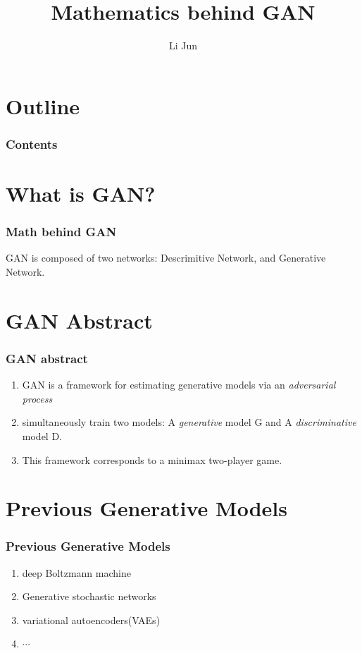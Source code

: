\documentclass{beamer}
\title{Mathematics behind GAN}
\author{Li Jun}
\begin{document}
\begin{frame}
 \titlepage  
\end{frame}

\section*{Outline}
\begin{frame}
  \frametitle{Contents}
  \tableofcontents
\end{frame}

\section{What is GAN?}
\begin{frame}
  \frametitle{Math behind GAN}
  \begin{definition}
    GAN is composed of two networks: Descrimitive Network, and Generative Network.
  \end{definition}
\end{frame}

\section{GAN Abstract}
\begin{frame}
 \frametitle{GAN abstract}   
 \begin{enumerate}
   \item<1->  GAN is a framework for estimating generative models via an \emph{adversarial process}
   \item<2->  simultaneously train two models: A \emph{generative} model G and A \emph{discriminative} model D. 
   \item<3->  This framework corresponds to a minimax two-player game. 
 \end{enumerate}
\end{frame}

\section{Previous Generative Models}
\begin{frame}
 \frametitle{Previous Generative Models}   
 \begin{enumerate}
   \item<1->  deep Boltzmann machine  
   \item<2->  Generative stochastic networks 
   \item<3->  variational autoencoders(VAEs) 
   \item<4->  $\cdots$
 \end{enumerate}
\end{frame}
\end{document}
